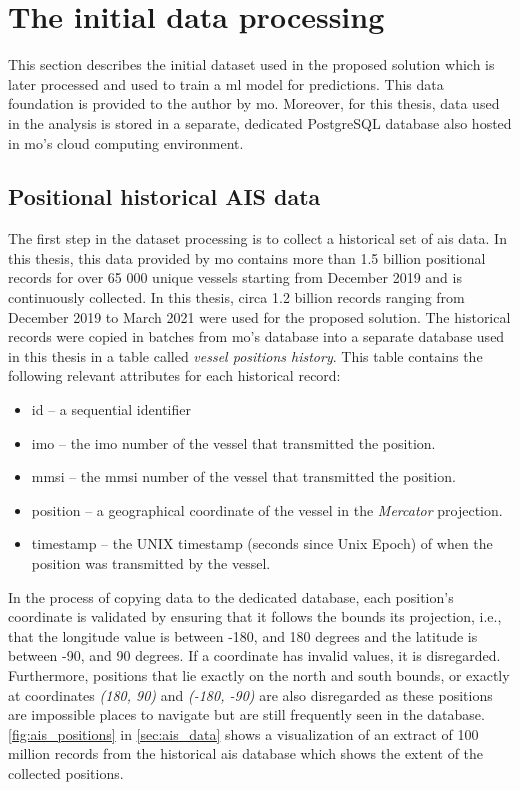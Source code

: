 \section{The initial data processing}

This section describes the initial dataset used in the proposed solution which is later processed and used to train a \acrshort{ml} model for predictions. This data foundation is provided to the author by \acrfull{mo}. Moreover, for this thesis, data used in the analysis is stored in a separate, dedicated PostgreSQL database also hosted in \acrshort{mo}'s cloud computing environment.

\subsection{Positional historical AIS data}

The first step in the dataset processing is to collect a historical set of \acrshort{ais} data. In this thesis, this data provided by \acrshort{mo} contains more than 1.5 billion positional records for over 65 000 unique vessels starting from December 2019 and is continuously collected. In this thesis, circa 1.2 billion records ranging from December 2019 to March 2021 were used for the proposed solution. The historical records were copied in batches from \acrshort{mo}'s database into a separate database used in this thesis in a table called \textit{vessel positions history}. This table contains the following relevant attributes for each historical record:

\begin{itemize}
    \item id -- a sequential identifier
    \item imo -- the \acrshort{imo} number of the vessel that transmitted the position.
    \item mmsi -- the \acrshort{mmsi} number of the vessel that transmitted the position.
    \item position -- a geographical coordinate of the vessel in the \textit{Mercator} projection.
    \item timestamp -- the UNIX timestamp (seconds since Unix Epoch) of when the position was transmitted by the vessel.
\end{itemize}

In the process of copying data to the dedicated database, each position's coordinate is validated by ensuring that it follows the bounds its projection, i.e., that the longitude value is between -180, and 180 degrees and the latitude is between -90, and 90 degrees. If a coordinate has invalid values, it is disregarded. Furthermore, positions that lie exactly on the north and south bounds, or exactly at coordinates \textit{(180, 90)} and \textit{(-180, -90)} are also disregarded as these positions are impossible places to navigate but are still frequently seen in the database. \cref{fig:ais_positions} in \cref{sec:ais_data} shows a visualization of an extract of 100 million records from the historical \acrshort{ais} database which shows the extent of the collected positions.

